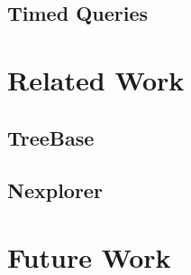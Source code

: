\documentclass[10pt]{article}
\begin{document}
\subsection{Timed Queries}



\section{Related Work}

\subsection{TreeBase}

\subsection{Nexplorer}


\section{Future Work}
\end{document}

